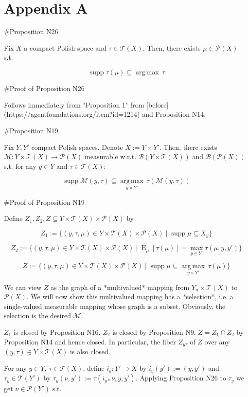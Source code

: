 \documentclass[a4paper]{article}
\DeclareMathOperator{\Supp}{supp}
\DeclareMathOperator{\E}{E}
\newcommand{\Argmax}[1]{\underset{#1}{\operatorname{arg\,max}}\,}
\newcommand{\Prob}{\mathcal{P}}
\newcommand{\T}{\mathcal{T}}
\newcommand{\B}{\mathcal{B}}
\begin{document}
\section{Appendix A}

\#Proposition N26

Fix ${X}$ a compact Polish space and ${\tau \in \T(X)}$. Then, there exists ${\mu \in \Prob(X)}$ s.t.

$$\Supp \tau(\mu) \subseteq \Argmax{} \tau$$

\#Proof of Proposition N26

Follows immediately from "Proposition 1" from [before](https://agentfoundations.org/item?id=1214) and Proposition N14.

\#Proposition N19

Fix ${Y,Y'}$ compact Polish spaces. Denote ${X:=Y \times Y'}$. Then, there exists ${\mathcal{M}: Y \times \T(X) \rightarrow \Prob(X)}$ measurable w.r.t. ${\B(Y \times \T(X))}$ and ${\B(\Prob(X))}$ s.t. for any ${y \in Y}$ and ${\tau \in \T(X)}$:


$$\Supp \mathcal{M}(y,\tau) \subseteq \Argmax{y \times Y'} \tau(\mathcal{M}(y,\tau))$$

\#Proof of Proposition N19

Define ${Z_1, Z_2, Z \subseteq Y \times \T(X) \times \Prob(X)}$ by

$${Z_1:=\{(y,\tau,\mu) \in Y \times \T(X) \times \Prob(X) \mid \Supp \mu \subseteq X_y\}}$$

$${Z_2:=\{(y,\tau,\mu) \in Y \times \T(X) \times \Prob(X) \mid \E_\mu[\tau(\mu)] = \max_{y \in Y'} \tau(\mu,y,y')\}}$$

$${Z:=\{(y,\tau,\mu) \in Y \times \T(X) \times \Prob(X) \mid \Supp \mu \subseteq \Argmax{y \times Y'} \tau(\mu)\}}$$

We can view ${Z}$ as the graph of a *multivalued* mapping from ${Y_n \times \T(X)}$ to ${\Prob(X)}$. We will now show this multivalued mapping has a *selection*, i.e. a single-valued measurable mapping whose graph is a subset. Obviously, the selection is the desired ${\mathcal{M}}$.

${Z_1}$ is closed by Proposition N16. ${Z_2}$ is closed by Proposition N9. ${Z = Z_1 \cap Z_2}$ by Proposition N14 and hence closed. In particular, the fiber ${Z_{y\tau}}$ of ${Z}$ over any ${(y,\tau) \in Y \times \T(X)}$ is also closed. 

For any ${y \in Y}$, ${\tau \in \T(X)}$, define ${i_y: Y' \rightarrow X}$ by ${i_y(y'):=(y,y')}$ and ${\tau_y \in \T(Y')}$ by ${\tau_y(\nu,y'):=\tau(i_{y*}\nu,y,y')}$. Applying Proposition N26 to ${\tau_y}$ we get ${\nu \in \Prob(Y')}$ s.t.
\end{document}
